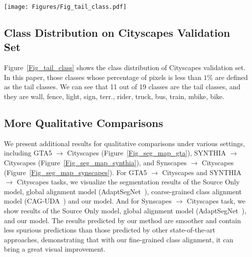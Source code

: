 \documentclass[runningheads]{llncs}
\begin{document}
\begin{figure*}
   \centering
   \texttt{[image: Figures/Fig\_tail\_class.pdf]}\vspace{-2mm}
   \caption{Class distribution on Cityscapes validation set. The tail classes are highlighted in \textcolor{blue}{blue}.}
   \label{Fig_tail_class}
\end{figure*}

\subsection{Class Distribution on Cityscapes Validation Set}
\label{appendix:tail_class}
Figure~\ref{Fig_tail_class} shows the class distribution of Cityscapes validation set. In this paper, those classes whose percentage of pixels is less than $1\%$ are defined as the tail classes. We can see that 11 out of 19 classes are the tail classes, and they are wall, fence, light, sign, terr., rider, truck, bus, train, mbike, bike.

\subsection{More Qualitative Comparisons}
\label{appendix:qualitative}
We present additional results for qualitative comparisons under various settings, including GTA5 $\rightarrow$ Cityscapes (Figure~\ref{Fig_seg_map_gta}), SYNTHIA $\rightarrow$ Cityscapes (Figure~\ref{Fig_seg_map_synthia}), and Synscapes $\rightarrow$ Cityscapes (Figure~\ref{Fig_seg_map_synscapes}). 
For GTA5 $\rightarrow$ Cityscapes and SYNTHIA $\rightarrow$ Cityscapes tasks, we visualize the segmentation results of the Source Only model, global alignment model (AdaptSegNet~\cite{tsai2018learning}), coarse-grained class alignment model (CAG-UDA~\cite{zhang2019category}) and our model. And for Synscapes $\rightarrow$ Cityscapes task, we show results of the Source Only model, global alignment model (AdaptSegNet~\cite{tsai2018learning}), and our model. The results predicted by our method are smoother and contain less spurious predictions than those predicted by other state-of-the-art approaches, demonstrating that with our fine-grained class alignment, it can bring a great visual improvement.
\end{document}
